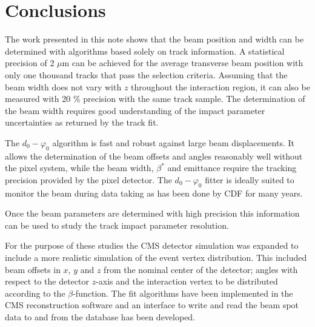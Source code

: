 \documentclass{cmspaper}
\begin{document}


\clearpage
\section{Conclusions}
The work presented in this note shows that the beam position and 
width can be determined with algorithms based solely on track information.
A statistical precision of 2 $\mu$m  can be achieved for the average transverse
beam position with only one thousand tracks that pass the selection criteria. 
Assuming that the beam width does not vary with
$z$ throughout the interaction region, it can also be 
measured with 20 \% precision with the same track sample.
The determination of the beam width requires good understanding of the impact parameter uncertainties as returned 
by the track fit. 




The $d_0 - \varphi_0$ algorithm is fast and robust against large beam displacements. 
It allows the determination of the beam offsets and angles reasonably well 
without the pixel system, 
while the beam width, $\beta^{*}$ and emittance require the tracking precision provided by the pixel detector.
The  $d_0 - \varphi_0$ fitter is ideally suited to monitor the beam during data 
taking as has been  done by CDF 
for many years. 

Once the beam parameters are determined with high precision this information can be used to study the track impact parameter
resolution. 

For the purpose of these studies the CMS detector simulation was expanded to include a more realistic simulation of the event vertex distribution. 
This included beam offsets in $x$, $y$ and $z$ from the nominal center of the detector; angles with respect to the 
detector $z$-axis and the interaction vertex to be distributed according to the $\beta$-function. The
fit algorithms have been implemented in the CMS reconstruction software and an interface to write and read the
beam spot data to and from the database has been developed.
\end{document}
